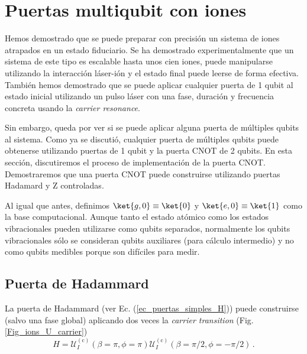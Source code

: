 \section{Puertas multiqubit con iones} \label{sec_ions_multiqubit}

Hemos demostrado que se puede preparar con precisión un sistema de iones atrapados en un estado fiduciario. Se ha demostrado experimentalmente que un sistema de este tipo es escalable hasta unos cien iones, puede manipularse utilizando la interacción láser-ión y el estado final puede leerse de forma efectiva. También hemos demostrado que se puede aplicar cualquier puerta de 1 qubit al estado inicial utilizando un pulso láser con una fase, duración y frecuencia concreta usando la \textit{carrier resonance}. 

Sin embargo, queda por ver si se puede aplicar alguna puerta de múltiples qubits al sistema. Como ya se discutió, cualquier puerta de múltiples qubits puede obtenerse utilizando puertas de 1 qubit y la puerta CNOT de 2 qubits. En esta sección, discutiremos el proceso de implementación de la puerta CNOT. Demostraremos que una puerta CNOT puede construirse utilizando puertas Hadamard y Z controladas.

Al igual que antes, definimos $\ket{g,0} \equiv \ket{0}$ y $\ket{e,0} \equiv \ket{1}$ como la base computacional.  Aunque tanto el estado atómico como los estados vibracionales pueden utilizarse como qubits separados, normalmente los qubits vibracionales sólo se consideran qubits auxiliares (para cálculo intermedio) y no como qubits medibles porque son difíciles para medir.

\subsection{Puerta de Hadammard}

La puerta de Hadammard (ver Ec. (\ref{ec_puertas_simples_H})) puede construirse (salvo una fase global) aplicando dos veces la \textit{carrier transition} (Fig. \ref{Fig_ions_U_carrier})
	\begin{equation}  \label{ec_ions_H}
	H = \mathcal{U}_I^{(\text{c})}(\beta = \pi, \phi = \pi) \mathcal{U}_I^{(\text{c})}(\beta = \pi/2, \phi = -\pi/2) \, .
	\end{equation}




